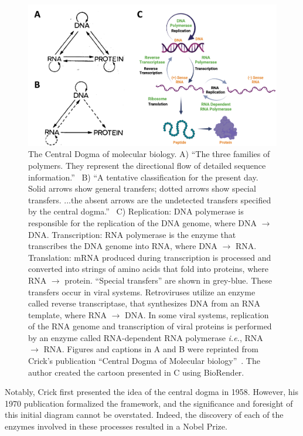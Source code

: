 \begin{figure}
    \centering
    \includegraphics[width=\textwidth]{chapters/figures/central_dogma.jpg}
    \caption{\label{fig:central_dogma}The Central Dogma of molecular biology. 
    A) \enquote{The three families of polymers. They represent the directional flow of detailed sequence information.}~\cite{crick_central}
    B) \enquote{A tentative classification for the present day. Solid arrows show general transfers; dotted arrows show special transfers. ...the absent arrows are the undetected transfers specified by the central dogma.}~\cite{crick_central}
    C) Replication: DNA polymerase is responsible for the replication of the DNA genome, where DNA $\rightarrow$ DNA.
    Transcription: RNA polymerase is the enzyme that transcribes the DNA genome into RNA, where DNA $\rightarrow$ RNA. 
    Translation: mRNA produced during transcription is processed and converted into strings of amino acids that fold into proteins, where RNA $\rightarrow$ protein. 
    \enquote{Special transfers} are shown in grey-blue.
    These transfers occur in viral systems.
    Retroviruses utilize an enzyme called reverse transcriptase, that synthesizes DNA from an RNA template, where RNA $\rightarrow$ DNA.
    In some viral systems, replication of the RNA genome and transcription of viral proteins is performed by an enzyme called RNA-dependent RNA polymerase \textit{i.e.}, RNA $\rightarrow$ RNA.
    Figures and captions in A and B were reprinted from Crick's publication \enquote{Central Dogma of Molecular biology}~\cite{crick_central}.
    The author created the cartoon presented in C using BioRender.
    }
\end{figure}

Notably, Crick first presented the idea of the central dogma in 1958. 
However, his 1970 publication formalized the framework, and the significance and foresight of this initial diagram cannot be overstated.
Indeed, the discovery of each of the enzymes involved in these processes resulted in a Nobel Prize.


